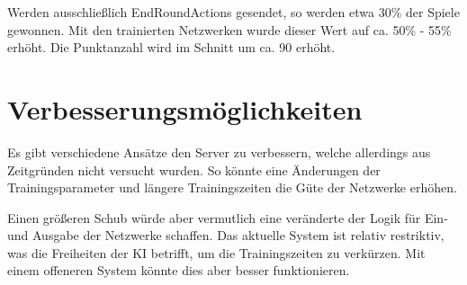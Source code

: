\documentclass[11pt, twocolumn]{article}
\begin{document}
Werden ausschließlich EndRoundActions gesendet, so werden etwa 30\% der Spiele gewonnen. Mit den trainierten Netzwerken wurde dieser Wert auf ca. 50\% - 55\% erhöht. Die Punktanzahl wird im Schnitt um ca. 90 erhöht.


\section{Verbesserungsmöglichkeiten}
Es gibt verschiedene Ansätze den Server zu verbessern, welche allerdings aus Zeitgründen nicht versucht wurden. So könnte eine Änderungen der Trainingsparameter und längere Trainingszeiten die Güte der Netzwerke erhöhen.

Einen größeren Schub würde aber vermutlich eine veränderte der Logik für Ein- und Ausgabe der Netzwerke schaffen. Das aktuelle System ist relativ restriktiv, was die Freiheiten der KI betrifft, um die Trainingszeiten zu verkürzen. Mit einem offeneren System könnte dies aber besser funktionieren.


\printbibliography
\end{document}
